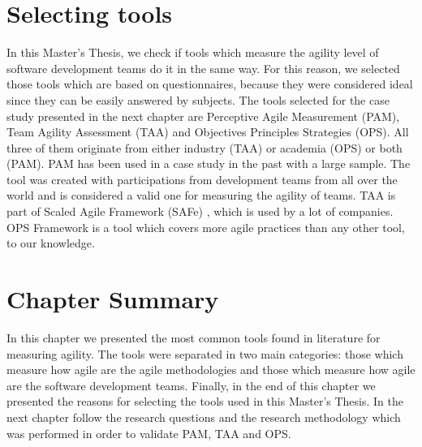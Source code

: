 \section{Selecting tools}
In this Master's Thesis, we check if tools which measure the agility level of software development teams do it in the same way. For this reason, we selected those tools which are based on questionnaires, because they were considered ideal since they can be easily answered by subjects. The tools selected for the case study presented in the next chapter are Perceptive Agile Measurement (PAM), Team Agility Assessment (TAA) and Objectives Principles Strategies (OPS). All three of them originate from either industry (\ac{TAA}) or academia (\ac{OPS}) or both (\ac{PAM}). \ac{PAM} has been used in a case study in the past with a large sample. The tool was created with participations from development teams from all over the world and is considered a valid one for measuring the agility of teams. \ac{TAA} is part of Scaled Agile Framework (SAFe) \cite{scaled_agile_framework}, which is used by a lot of companies. \ac{OPS} Framework is a tool which covers more agile practices than any other tool, to our knowledge.

\section{Chapter Summary}
In this chapter we presented the most common tools found in literature for measuring agility. The tools were separated in two main categories: those which measure how agile are the agile methodologies and those which measure how agile are the software development teams. Finally, in the end of this chapter we presented the reasons for selecting the tools used in this Master's Thesis.
 In the next chapter follow the research questions and the research methodology which was performed in order to validate \ac{PAM}, \ac{TAA} and \ac{OPS}.